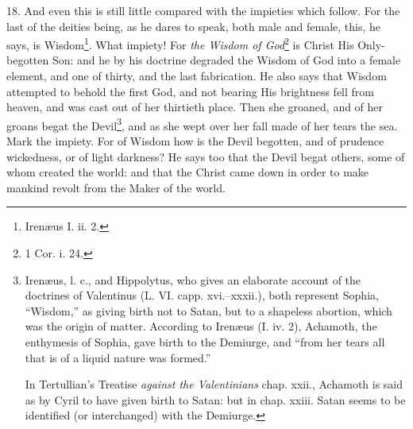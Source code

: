 18. And even this is still little compared with the impieties which follow. For the last of the deities being, as he dares to speak, both male and female, this, he says, is Wisdom\footnote{Irenæus I. ii. 2.}. What impiety! For \emph{the Wisdom of God}\footnote{1 Cor. i. 24.} is Christ His Only-begotten Son: and he by his doctrine degraded the Wisdom of God into a female element, and one of thirty, and the last fabrication. He also says that Wisdom attempted to behold the first God, and not bearing His brightness fell from heaven, and was cast out of her thirtieth place. Then she groaned, and of her groans begat the Devil\footnote{Irenæus, l. c., and Hippolytus, who gives an elaborate account of the doctrines of Valentinus (L. VI. capp. xvi.–xxxii.), both represent Sophia, “Wisdom,” as giving birth not to Satan, but to a shapeless abortion, which was the origin of matter. According to Irenæus (I. iv. 2), Achamoth, the enthymesis of Sophia, gave birth to the Demiurge, and “from her tears all that is of a liquid nature was formed.” \par In Tertullian’s Treatise \emph{against the Valentinians} chap. xxii., Achamoth is said as by Cyril to have given birth to Satan: but in chap. xxiii. Satan seems to be identified (or interchanged) with the Demiurge.}, and as she wept over her fall made of her tears the sea. Mark the impiety. For of Wisdom how is the Devil begotten, and of prudence wickedness, or of light darkness? He says too that the Devil begat others, some of whom created the world: and that the Christ came down in order to make mankind revolt from the Maker of the world.

